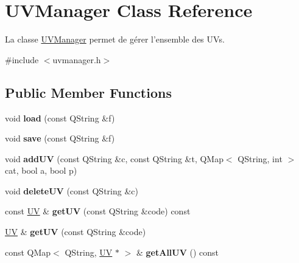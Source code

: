 \hypertarget{class_u_v_manager}{\section{U\+V\+Manager Class Reference}
\label{class_u_v_manager}
}


La classe \hyperlink{class_u_v_manager}{U\+V\+Manager} permet de gérer l'ensemble des U\+Vs.  




{\ttfamily \#include $<$uvmanager.\+h$>$}

\subsection*{Public Member Functions}
\begin{DoxyCompactItemize}
\item 
\hypertarget{class_u_v_manager_a60556f66f72f41786ffb70f066f1a846}{void {\bfseries load} (const Q\+String \&f)}\label{class_u_v_manager_a60556f66f72f41786ffb70f066f1a846}

\item 
\hypertarget{class_u_v_manager_a1e52ce1b69c6239d19016ec3cb74bd1c}{void {\bfseries save} (const Q\+String \&f)}\label{class_u_v_manager_a1e52ce1b69c6239d19016ec3cb74bd1c}

\item 
\hypertarget{class_u_v_manager_a40043a0cc0ae5153600c76220ce76f52}{void {\bfseries add\+U\+V} (const Q\+String \&c, const Q\+String \&t, Q\+Map$<$ Q\+String, int $>$ cat, bool a, bool p)}\label{class_u_v_manager_a40043a0cc0ae5153600c76220ce76f52}

\item 
\hypertarget{class_u_v_manager_ab1f7e555b456dd2d34907061f65b1405}{void {\bfseries delete\+U\+V} (const Q\+String \&c)}\label{class_u_v_manager_ab1f7e555b456dd2d34907061f65b1405}

\item 
\hypertarget{class_u_v_manager_ac1a6b93630bb709b33aff7cba798044d}{const \hyperlink{class_u_v}{U\+V} \& {\bfseries get\+U\+V} (const Q\+String \&code) const }\label{class_u_v_manager_ac1a6b93630bb709b33aff7cba798044d}

\item 
\hypertarget{class_u_v_manager_a00f95b40d834d93f0fe326e1a00649a4}{\hyperlink{class_u_v}{U\+V} \& {\bfseries get\+U\+V} (const Q\+String \&code)}\label{class_u_v_manager_a00f95b40d834d93f0fe326e1a00649a4}

\item 
\hypertarget{class_u_v_manager_a0d65e0ea79cf14c5d92b1013805be42a}{const Q\+Map$<$ Q\+String, \hyperlink{class_u_v}{U\+V} $\ast$ $>$ \& {\bfseries get\+All\+U\+V} () const }\label{class_u_v_manager_a0d65e0ea79cf14c5d92b1013805be42a}


\end{DoxyCompactItemize}
